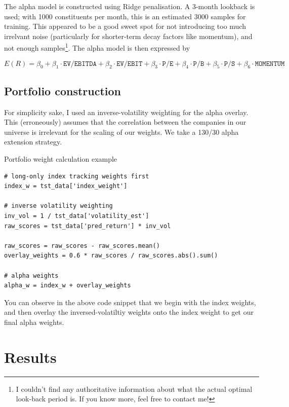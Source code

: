 \documentclass[12pt]{article}
\begin{document}
The alpha model is constructed using Ridge penalisation. A 3-month lookback is used; with 1000 constituents 
per month, this is an estimated 3000 samples for training. This appeared to be a good sweet spot for 
not introducing too much irrelvant noise (particularly for shorter-term decay factors like momentum), and 
not enough samples\footnote{I couldn't find any authoritative information about what the actual 
optimal look-back period is. If you know more, feel free to contact me!}. The alpha model is then expressed 
by

$$ E(R) = \beta_0 + \beta_1 \cdot \texttt{EV/EBITDA} + \beta_2 \cdot \texttt{EV/EBIT} + \beta_3 \cdot \texttt{P/E} + \beta_4 \cdot \texttt{P/B} + \beta_5 \cdot \texttt{P/S} + \beta_6 \cdot \texttt{MOMENTUM}
$$

\subsection{Portfolio construction}

For simplicity sake, I used an inverse-volatility weighting for the alpha overlay. This (erroneously)
assumes that the correlation between the companies in our universe is irrelevant for the scaling of 
our weights. We take a 130/30 alpha extension strategy.
\begin{example}{Portfolio weight calculation example}
\begin{verbatim}
# long-only index tracking weights first
index_w = tst_data['index_weight']

# inverse volatility weighting
inv_vol = 1 / tst_data['volatility_est']
raw_scores = tst_data['pred_return'] * inv_vol

raw_scores = raw_scores - raw_scores.mean()
overlay_weights = 0.6 * raw_scores / raw_scores.abs().sum()

# alpha weights
alpha_w = index_w + overlay_weights
\end{verbatim}
\end{example}
You can observe in the above code snippet that we begin with the index weights, and then overlay the 
inversed-volatiltiy weights onto the index weight to get our final alpha weights.

\section{Results}
\end{document}
